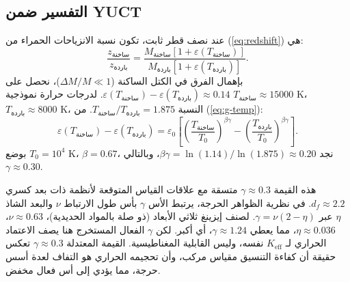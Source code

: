 \documentclass[11pt,a4paper]{article}
\newcommand{\Keff}{K_{\mathrm{eff}}}
\newcommand{\eps}{\varepsilon}
\newcommand{\df}{d_{\!f}}
\begin{document}
	\subsection{التفسير ضمن YUCT}
	\label{subsec:wd-yuct}
	
	عند نصف قطر ثابت، تكون نسبة الانزياحات الحمراء من (\ref{eq:redshift}) هي:
	\begin{equation}
		\frac{z_{\text{ساخنة}}}{z_{\text{باردة}}} = \frac{M_{\text{ساخنة}}[1+\eps(T_{\text{ساخنة}})]}{M_{\text{باردة}}[1+\eps(T_{\text{باردة}})]}.
		\label{eq:redshift-ratio}
	\end{equation}
	بإهمال الفرق في الكتل الساكنة ($\Delta M/M \ll 1$)، نحصل على $\eps(T_{\text{ساخنة}}) - \eps(T_{\text{باردة}}) \approx 0.14$. لدرجات حرارة نموذجية $T_{\text{ساخنة}} \approx 15000$ K، $T_{\text{باردة}} \approx 8000$ K، النسبة $T_{\text{ساخنة}}/T_{\text{باردة}} = 1.875$. من (\ref{eq:g-temp}):
	\begin{equation}
		\eps(T_{\text{ساخنة}}) - \eps(T_{\text{باردة}}) = \eps_0 \left[ \left( \frac{T_{\text{ساخنة}}}{T_0} \right)^{\beta\gamma} - \left( \frac{T_{\text{باردة}}}{T_0} \right)^{\beta\gamma} \right].
		\label{eq:eps-diff}
	\end{equation}
	بوضع $T_0 = 10^4$ K، $\beta = 0.67$، نجد $\beta\gamma = \ln(1.14) / \ln(1.875) \approx 0.20$، وبالتالي $\gamma \approx 0.30$.
	
	هذه القيمة $\gamma \approx 0.3$ متسقة مع علاقات القياس المتوقعة لأنظمة ذات بعد كسري $\df \approx 2.2$. في نظرية الظواهر الحرجة، يرتبط الأس $\gamma$ بأس طول الارتباط $\nu$ والبعد الشاذ $\eta$ عبر $\gamma = \nu(2-\eta)$. لصنف إيزينغ ثلاثي الأبعاد (ذو صلة بالمواد الحديدية)، $\nu \approx 0.63$، $\eta \approx 0.036$، مما يعطي $\gamma \approx 1.24$، أي أكبر. لكن $\gamma$ الفعال المستخرج هنا يصف الاعتماد الحراري لـ $\Keff$ نفسه، وليس القابلية المغناطيسية. القيمة المعتدلة $\gamma \approx 0.3$ تعكس حقيقة أن كفاءة التنسيق مقياس مركب، وأن تحجيمه الحراري هو التفاف لعدة أسس حرجة، مما يؤدي إلى أس فعال مخفض.
	
\end{document}
